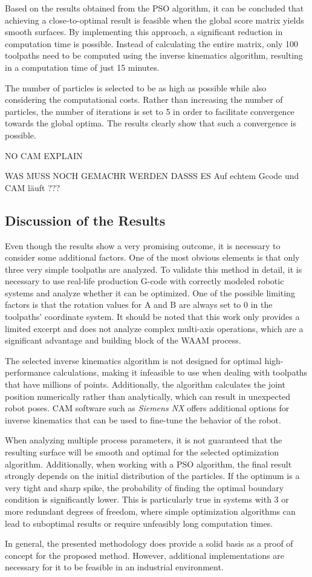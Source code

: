 Based on the results obtained from the PSO algorithm, it can be concluded that achieving a close-to-optimal result is feasible when the global score matrix yields smooth surfaces. By implementing this approach, a significant reduction in computation time is possible. Instead of calculating the entire matrix, only 100 toolpaths need to be computed using the inverse kinematics algorithm, resulting in a computation time of just 15 minutes.

The number of particles is selected to be as high as possible while also considering the computational costs. Rather than increasing the number of particles, the number of iterations is set to 5 in order to facilitate convergence towards the global optima.
The results clearly show that such a convergence is possible.


NO CAM EXPLAIN


WAS MUSS NOCH GEMACHR WERDEN DASSS ES Auf echtem Gcode und CAM läuft ???




\newpage
\subsection{Discussion of the Results}%
Even though the results show a very promising outcome, it is necessary to consider some additional factors. One of the most obvious elements is that only three very simple toolpaths are analyzed. To validate this method in detail, it is necessary to use real-life production G-code with correctly modeled robotic systems and analyze whether it can be optimized. One of the possible limiting factors is that the rotation values for A and B are always set to 0 in the toolpaths' coordinate system. It should be noted that this work only provides a limited excerpt and does not analyze complex multi-axis operations, which are a significant advantage and building block of the WAAM process.

The selected inverse kinematics algorithm is not designed for optimal high-performance calculations, making it infeasible to use when dealing with toolpaths that have millions of points. Additionally, the algorithm calculates the joint position numerically rather than analytically, which can result in unexpected robot poses. CAM software such as \textit{Siemens NX} offers additional options for inverse kinematics that can be used to fine-tune the behavior of the robot.

When analyzing multiple process parameters, it is not guaranteed that the resulting surface will be smooth and optimal for the selected optimization algorithm. Additionally, when working with a PSO algorithm, the final result strongly depends on the initial distribution of the particles. If the optimum is a very tight and sharp spike, the probability of finding the optimal boundary condition is significantly lower. This is particularly true in systems with 3 or more redundant degrees of freedom, where simple optimization algorithms can lead to suboptimal results or require unfeasibly long computation times.

In general, the presented methodology does provide a solid basis as a proof of concept for the proposed method. However, additional implementations are necessary for it to be feasible in an industrial environment.
